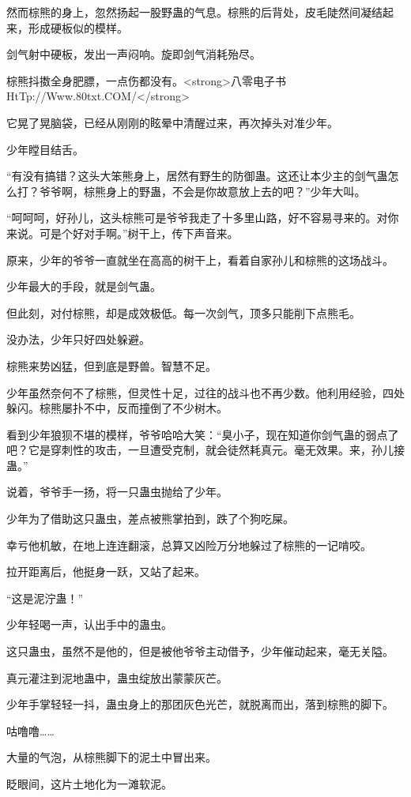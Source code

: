 \begin{this_body}
然而棕熊的身上，忽然扬起一股野蛊的气息。棕熊的后背处，皮毛陡然间凝结起来，形成硬板似的模样。

剑气射中硬板，发出一声闷响。旋即剑气消耗殆尽。

棕熊抖擞全身肥膘，一点伤都没有。<strong>八零电子书HtTp://Www.80txt.COM/</strong>

它晃了晃脑袋，已经从刚刚的眩晕中清醒过来，再次掉头对准少年。

少年瞠目结舌。

“有没有搞错？这头大笨熊身上，居然有野生的防御蛊。这还让本少主的剑气蛊怎么打？爷爷啊，棕熊身上的野蛊，不会是你故意放上去的吧？”少年大叫。

“呵呵呵，好孙儿，这头棕熊可是爷爷我走了十多里山路，好不容易寻来的。对你来说。可是个好对手啊。”树干上，传下声音来。

原来，少年的爷爷一直就坐在高高的树干上，看着自家孙儿和棕熊的这场战斗。

少年最大的手段，就是剑气蛊。

但此刻，对付棕熊，却是成效极低。每一次剑气，顶多只能削下点熊毛。

没办法，少年只好四处躲避。

棕熊来势凶猛，但到底是野兽。智慧不足。

少年虽然奈何不了棕熊，但灵性十足，过往的战斗也不再少数。他利用经验，四处躲闪。棕熊屡扑不中，反而撞倒了不少树木。

看到少年狼狈不堪的模样，爷爷哈哈大笑：“臭小子，现在知道你剑气蛊的弱点了吧？它是穿刺性的攻击，一旦遭受克制，就会徒然耗真元。毫无效果。来，孙儿接蛊。”

说着，爷爷手一扬，将一只蛊虫抛给了少年。

少年为了借助这只蛊虫，差点被熊掌拍到，跌了个狗吃屎。

幸亏他机敏，在地上连连翻滚，总算又凶险万分地躲过了棕熊的一记啃咬。

拉开距离后，他挺身一跃，又站了起来。

“这是泥泞蛊！”

少年轻喝一声，认出手中的蛊虫。

这只蛊虫，虽然不是他的，但是被他爷爷主动借予，少年催动起来，毫无关隘。

真元灌注到泥地蛊中，蛊虫绽放出蒙蒙灰芒。

少年手掌轻轻一抖，蛊虫身上的那团灰色光芒，就脱离而出，落到棕熊的脚下。

咕噜噜……

大量的气泡，从棕熊脚下的泥土中冒出来。

眨眼间，这片土地化为一滩软泥。


\end{this_body}
